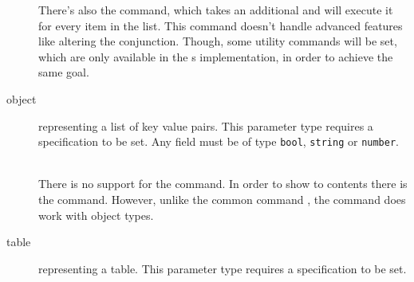 \documentclass{ltxdoc}
\newcommand\showexample[5][15pt]{%
\begin{minipage}[t]{.5\linewidth - .5 \columnsep}%

\end{minipage}\hspace*{\columnsep}%
\begin{minipage}[t]{.5\linewidth - .5 \columnsep}%

\end{minipage}\\%
}
\begin{document}
\begin{description}
        \DescribeMacro{\forparamlist}
        There's also the \cmd{\forparamlist} command, which takes an additional  and will execute it for every item in the list.
        This command doesn't handle advanced features like altering the conjunction.
        Though, some utility commands will be set, which are only available in the s implementation, in order to achieve the same goal.
        \item[object] representing a list of key value pairs.
        This parameter type requires a  specification to be set.
        Any field must be of type \texttt{bool}, \texttt{string} or \texttt{number}.\\
        \showexample{16}{16-24}{7}{7-9}
        There is no support for the \cmd{\param} command.
        \DescribeMacro{\paramfield}
        In order to show to contents there is the \cmd{\paramfield} command.
        However, unlike the common command \cmd{\param}, the command \cmd{\hasparam} does work with object types.
        \item[table] representing a table.
        This parameter type requires a  specification to be set.\\
        \showexample[20pt]{25}{25}{10}{10}
    \end{description}

%    
%
%    
\end{document}
